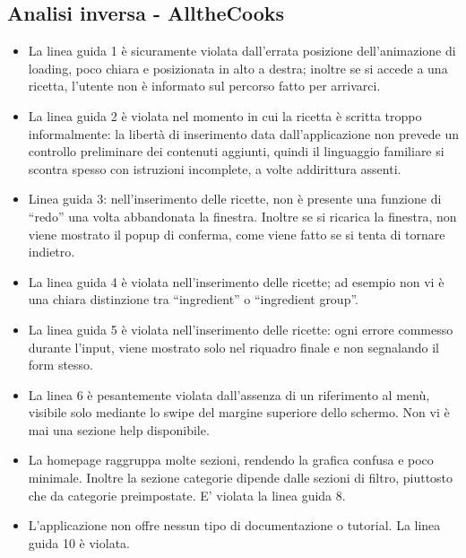 \subsection*{Analisi inversa - AlltheCooks}

\begin{itemize}
\item La linea guida 1 è sicuramente violata dall'errata posizione dell'animazione di loading, poco chiara e posizionata in alto a destra; inoltre se si accede a una ricetta, l'utente non è informato sul percorso fatto per arrivarci.\\

\item La linea guida 2 è violata nel momento in cui la ricetta è scritta troppo informalmente: la libertà di inserimento data dall'applicazione non prevede un controllo preliminare dei contenuti aggiunti, quindi il linguaggio familiare si scontra spesso con istruzioni incomplete, a volte addirittura assenti.

\item Linea guida 3: nell'inserimento delle ricette, non è presente una funzione di ``redo'' una volta abbandonata la finestra. Inoltre se si ricarica la finestra, non viene mostrato il popup di conferma, come viene fatto se si tenta di tornare indietro.

\item La linea guida 4 è violata nell'inserimento delle ricette; ad esempio non vi è una chiara distinzione tra ``ingredient'' o ``ingredient group''.

\item La linea guida 5  è violata nell'inserimento delle ricette: ogni errore commesso durante l'input, viene mostrato solo nel riquadro finale e non segnalando il form stesso.

\item La linea 6 è pesantemente violata dall'assenza di un riferimento al menù, visibile solo mediante lo swipe del margine superiore dello schermo. Non vi è mai una sezione help disponibile.

\item La homepage raggruppa molte sezioni, rendendo la grafica confusa e poco minimale. Inoltre la sezione categorie dipende dalle sezioni di filtro, piuttosto che da categorie preimpostate. E' violata la linea guida 8.

\item L'applicazione non offre nessun tipo di documentazione o tutorial. La linea guida 10 è violata.
\end{itemize}

